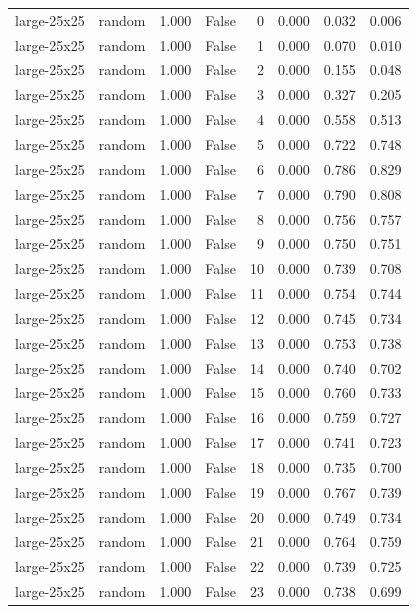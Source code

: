 \begin{tabular}{llrrrrrr}
large-25x25 & random & 1.000 & False & 0 & 0.000 & 0.032 & 0.006 \\
large-25x25 & random & 1.000 & False & 1 & 0.000 & 0.070 & 0.010 \\
large-25x25 & random & 1.000 & False & 2 & 0.000 & 0.155 & 0.048 \\
large-25x25 & random & 1.000 & False & 3 & 0.000 & 0.327 & 0.205 \\
large-25x25 & random & 1.000 & False & 4 & 0.000 & 0.558 & 0.513 \\
large-25x25 & random & 1.000 & False & 5 & 0.000 & 0.722 & 0.748 \\
large-25x25 & random & 1.000 & False & 6 & 0.000 & 0.786 & 0.829 \\
large-25x25 & random & 1.000 & False & 7 & 0.000 & 0.790 & 0.808 \\
large-25x25 & random & 1.000 & False & 8 & 0.000 & 0.756 & 0.757 \\
large-25x25 & random & 1.000 & False & 9 & 0.000 & 0.750 & 0.751 \\
large-25x25 & random & 1.000 & False & 10 & 0.000 & 0.739 & 0.708 \\
large-25x25 & random & 1.000 & False & 11 & 0.000 & 0.754 & 0.744 \\
large-25x25 & random & 1.000 & False & 12 & 0.000 & 0.745 & 0.734 \\
large-25x25 & random & 1.000 & False & 13 & 0.000 & 0.753 & 0.738 \\
large-25x25 & random & 1.000 & False & 14 & 0.000 & 0.740 & 0.702 \\
large-25x25 & random & 1.000 & False & 15 & 0.000 & 0.760 & 0.733 \\
large-25x25 & random & 1.000 & False & 16 & 0.000 & 0.759 & 0.727 \\
large-25x25 & random & 1.000 & False & 17 & 0.000 & 0.741 & 0.723 \\
large-25x25 & random & 1.000 & False & 18 & 0.000 & 0.735 & 0.700 \\
large-25x25 & random & 1.000 & False & 19 & 0.000 & 0.767 & 0.739 \\
large-25x25 & random & 1.000 & False & 20 & 0.000 & 0.749 & 0.734 \\
large-25x25 & random & 1.000 & False & 21 & 0.000 & 0.764 & 0.759 \\
large-25x25 & random & 1.000 & False & 22 & 0.000 & 0.739 & 0.725 \\
large-25x25 & random & 1.000 & False & 23 & 0.000 & 0.738 & 0.699 \\

\end{tabular}
